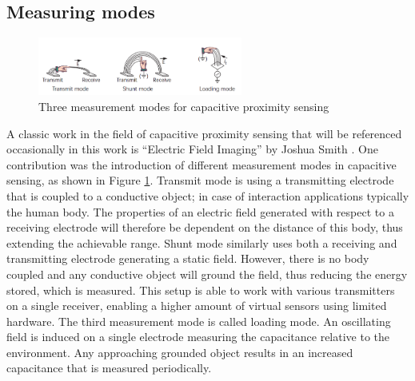 \subsection{Measuring modes}
\begin{figure} [h]
\centering
\includegraphics[width=0.6\textwidth]{images/cap_sensing_modes.png} 
\caption{Three measurement modes for capacitive proximity sensing \cite{Smith1996a}}
\label{fig:cap_sensing_modes}
\end{figure}
A classic work in the field of capacitive proximity sensing that will be referenced occasionally in this work is “Electric Field Imaging” by Joshua Smith \cite{Smith1999a}. One contribution was the introduction of different measurement modes in capacitive sensing, as shown in Figure \ref{fig:cap_sensing_modes}. 
Transmit mode is using a transmitting electrode that is coupled to a conductive object; in case of interaction applications typically the human body. The properties of an electric field generated with respect to a receiving electrode will therefore be dependent on the distance of this body, thus extending the achievable range.
Shunt mode similarly uses both a receiving and transmitting electrode generating a static field. However, there is no body coupled and any conductive object will ground the field, thus reducing the energy stored, which is measured. This setup is able to work with various transmitters on a single receiver, enabling a higher amount of virtual sensors using limited hardware. The third measurement mode is called loading mode. An oscillating field is induced on a single electrode measuring the capacitance relative to the environment. Any approaching grounded object results in an increased capacitance that is measured periodically.
